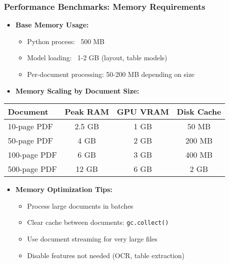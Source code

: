 \begin{frame}[fragile]\frametitle{Performance Benchmarks: Memory Requirements}
      \begin{itemize}
        \item \textbf{Base Memory Usage:}
        \begin{itemize}
            \item Python process: ~500 MB
            \item Model loading: ~1-2 GB (layout, table models)
            \item Per-document processing: 50-200 MB depending on size
        \end{itemize}
        \item \textbf{Memory Scaling by Document Size:}
      \end{itemize}

\begin{table}[h]
\centering
\small
\begin{tabular}{|l|c|c|c|}
\hline
\textbf{Document} & \textbf{Peak RAM} & \textbf{GPU VRAM} & \textbf{Disk Cache} \\
\hline
10-page PDF & 2.5 GB & 1 GB & 50 MB \\
\hline
50-page PDF & 4 GB & 2 GB & 200 MB \\
\hline
100-page PDF & 6 GB & 3 GB & 400 MB \\
\hline
500-page PDF & 12 GB & 6 GB & 2 GB \\
\hline
\end{tabular}
\end{table}

      \begin{itemize}
        \item \textbf{Memory Optimization Tips:}
        \begin{itemize}
            \item Process large documents in batches
            \item Clear cache between documents: \texttt{gc.collect()}
            \item Use document streaming for very large files
            \item Disable features not needed (OCR, table extraction)
        \end{itemize}
      \end{itemize}
\end{frame}

